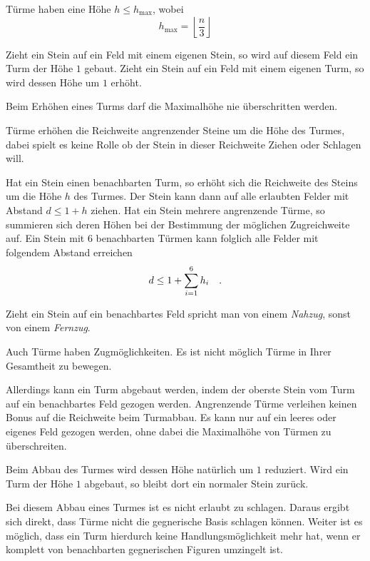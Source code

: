 Türme haben eine Höhe $h \le h_\text{max}$, wobei \[h_\text{max} = \left\lfloor \frac{n}{3}\right\rfloor\]

Zieht ein Stein auf ein Feld mit einem eigenen Stein, so wird auf diesem Feld ein Turm der Höhe $1$ gebaut.
Zieht ein Stein auf ein Feld mit einem eigenen Turm, so wird dessen Höhe um $1$ erhöht.

Beim Erhöhen eines Turms darf die Maximalhöhe nie überschritten werden.

\bigskip

Türme erhöhen die Reichweite angrenzender Steine um die Höhe des Turmes, dabei spielt es keine Rolle ob der Stein in dieser Reichweite Ziehen oder Schlagen will.

Hat ein Stein einen benachbarten Turm, so erhöht sich die Reichweite des Steins um die Höhe $h$ des Turmes. Der Stein kann dann auf alle erlaubten Felder mit Abstand $d \le 1 + h$ ziehen. Hat ein Stein mehrere angrenzende Türme, so summieren sich deren Höhen bei der Bestimmung der möglichen Zugreichweite auf. Ein Stein mit $6$ benachbarten Türmen kann folglich alle Felder mit folgendem Abstand erreichen \[d \le 1 + \sum_{i=1}^6 h_i\hspace*{10pt}.\]

Zieht ein Stein auf ein benachbartes Feld spricht man von einem \emph{Nahzug}, sonst von einem \emph{Fernzug}.

\newpage
{}

\bigskip

Auch Türme haben Zugmöglichkeiten. Es ist nicht möglich Türme in Ihrer Gesamtheit zu bewegen. 

Allerdings kann ein Turm abgebaut werden, indem der oberste Stein vom Turm auf ein benachbartes Feld gezogen werden. Angrenzende Türme verleihen keinen Bonus auf die Reichweite beim Turmabbau. Es kann nur auf ein leeres oder eigenes Feld gezogen werden, ohne dabei die Maximalhöhe von Türmen zu überschreiten.

Beim Abbau des Turmes wird dessen Höhe natürlich um $1$ reduziert. Wird ein Turm der Höhe $1$ abgebaut, so bleibt dort ein normaler Stein zurück.

Bei diesem Abbau eines Turmes ist es nicht erlaubt zu schlagen. Daraus ergibt sich direkt, dass Türme nicht die gegnerische Basis schlagen können. Weiter ist es möglich, dass ein Turm hierdurch keine Handlungsmöglichkeit mehr hat, wenn er komplett von benachbarten gegnerischen Figuren umzingelt ist. 

